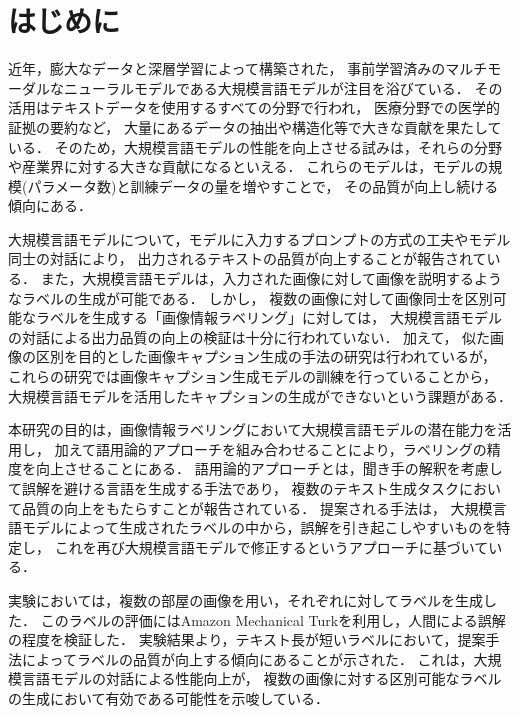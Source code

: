 \documentclass[a4paper,11pt]{jreport}
\begin{document}
\pagebreak \setcounter{page}{1}


\chapter{はじめに}

近年，膨大なデータと深層学習によって構築された，
事前学習済みのマルチモーダルなニューラルモデルである大規模言語モデルが注目を浴びている\cite{Yin2023}．
その活用はテキストデータを使用するすべての分野で行われ，
医療分野での医学的証拠の要約など，
大量にあるデータの抽出や構造化等で大きな貢献を果たしている\cite{Tang2023}．
そのため，大規模言語モデルの性能を向上させる試みは，それらの分野や産業界に対する大きな貢献になるといえる．
これらのモデルは，モデルの規模(パラメータ数)と訓練データの量を増やすことで，
その品質が向上し続ける傾向にある\cite{Devlin2019}．

大規模言語モデルについて，モデルに入力するプロンプトの方式の工夫やモデル同士の対話により，
出力されるテキストの品質が向上することが報告されている\cite{Wei2022, Zhou2022, Madaan2023, Zheng2023,LiRuosen2023}．
また，大規模言語モデルは，入力された画像に対して画像を説明するようなラベルの生成が可能である．
しかし，
複数の画像に対して画像同士を区別可能なラベルを生成する「画像情報ラベリング」に対しては，
大規模言語モデルの対話による出力品質の向上の検証は十分に行われていない．
加えて，
似た画像の区別を目的とした画像キャプション生成の手法の研究は行われている\cite{Vedantam2017,Cohn-Gordon2018,Nie2020,Andreas2016}が，
これらの研究では画像キャプション生成モデルの訓練を行っていることから，
大規模言語モデルを活用したキャプションの生成ができないという課題がある．

本研究の目的は，画像情報ラベリングにおいて大規模言語モデルの潜在能力を活用し，
加えて語用論的アプローチを組み合わせることにより，ラベリングの精度を向上させることにある．
語用論的アプローチとは，聞き手の解釈を考慮して誤解を避ける言語を生成する手法であり，
複数のテキスト生成タスクにおいて品質の向上をもたらすことが報告されている．
提案される手法は，
大規模言語モデルによって生成されたラベルの中から，誤解を引き起こしやすいものを特定し，
これを再び大規模言語モデルで修正するというアプローチに基づいている．

実験においては，複数の部屋の画像を用い，それぞれに対してラベルを生成した．
このラベルの評価にはAmazon Mechanical Turkを利用し，人間による誤解の程度を検証した．
実験結果より，テキスト長が短いラベルにおいて，提案手法によってラベルの品質が向上する傾向にあることが示された．
これは，大規模言語モデルの対話による性能向上が，
複数の画像に対する区別可能なラベルの生成において有効である可能性を示唆している．
\end{document}
